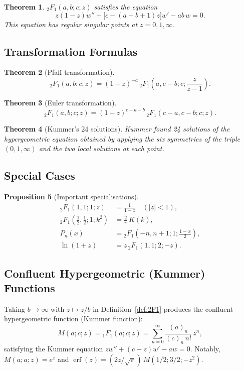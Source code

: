 \documentclass[12pt,a4paper]{amsart}
\newtheorem{theorem}{Theorem}[section]
\newtheorem{proposition}[theorem]{Proposition}
\theoremstyle{definition}
\begin{document}
\begin{theorem}
\({}_2F_1(a,b;c;z)\) satisfies the equation
\[
  z(1-z)w'' + \bigl[c-(a+b+1)z\bigr]w' - ab\,w = 0.
\]
This equation has regular singular points at \(z = 0, 1, \infty\).
\end{theorem}

\subsection{Transformation Formulas}

\begin{theorem}[Pfaff transformation]
\[
  {}_2F_1(a,b;c;z) = (1-z)^{-a}\,{}_2F_1\!\left(a,c-b;c;\frac{z}{z-1}\right).
\]
\end{theorem}

\begin{theorem}[Euler transformation]
\[
  {}_2F_1(a,b;c;z) = (1-z)^{c-a-b}\,{}_2F_1(c-a,c-b;c;z).
\]
\end{theorem}

\begin{theorem}[Kummer's 24 solutions]
Kummer found 24 solutions of the hypergeometric equation obtained by applying the six
symmetries of the triple \((0,1,\infty)\) and the two local solutions at each point.
\end{theorem}

\subsection{Special Cases}

\begin{proposition}[Important specialisations]
\begin{align*}
  {}_2F_1(1,1;1;z) &= \frac{1}{1-z} \quad (|z|<1),\\
  {}_2F_1\!\left(\tfrac{1}{2},\tfrac{1}{2};1;k^2\right) &= \frac{2}{\pi}\,K(k),\\
  P_n(x) &= {}_2F_1\!\left(-n,n+1;1;\tfrac{1-x}{2}\right),\\
  \ln(1+z) &= z\,{}_2F_1(1,1;2;-z).
\end{align*}
\end{proposition}

\subsection{Confluent Hypergeometric (Kummer) Functions}

Taking \(b \to \infty\) with \(z \mapsto z/b\) in Definition~\ref{def:2F1} produces the
confluent hypergeometric function (Kummer function):
\[
  M(a;c;z) = {}_1F_1(a;c;z)
  = \sum_{n=0}^\infty \frac{(a)_n}{(c)_n\,n!}\,z^n,
\]
satisfying the Kummer equation \(z w'' + (c-z)w' - aw = 0\).  Notably,
\(M(a;a;z) = e^z\) and
\(\operatorname{erf}(z) = (2z/\sqrt{\pi})\,M(1/2;3/2;-z^2)\).
\end{document}
